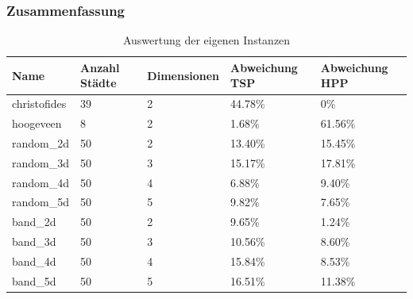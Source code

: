 \documentclass[11pt,a4paper]{article}
\begin{document}
\subsubsection{Zusammenfassung}
    \begin{table}[H]
                \centering
                \begin{tabular}{| p{2.0cm} | p{2.0cm} | p{2.5cm} | p{2.5cm} | p{2.5cm} |}
                    \hline
                    \small{\textbf{Name}} &
                    \small{\textbf{Anzahl Städte}}  & 
                    \small{\textbf{Dimensionen}} & 
                    \small{\textbf{Abweichung TSP}} & 
                    \small{\textbf{Abweichung HPP}} \\ \hline

                    christofides    & 39    & 2     & 44.78\%   & 0\%           \\ \hline
                    hoogeveen       & 8     & 2     & 1.68\%    & 61.56\%       \\ \hline
                    random\_2d      & 50    & 2     & 13.40\%   & 15.45\%       \\ \hline
                    random\_3d      & 50    & 3     & 15.17\%   & 17.81\%       \\ \hline
                    random\_4d      & 50    & 4     & 6.88\%    & 9.40\%        \\ \hline
                    random\_5d      & 50    & 5     & 9.82\%    & 7.65\%        \\ \hline
                    band\_2d        & 50    & 2     & 9.65\%    & 1.24\%        \\ \hline
                    band\_3d        & 50    & 3     & 10.56\%   & 8.60\%        \\ \hline
                    band\_4d        & 50    & 4     & 15.84\%   & 8.53\%        \\ \hline
                    band\_5d        & 50    & 5     & 16.51\%   & 11.38\%       \\ \hline
               \end{tabular}
                \caption{Auswertung der eigenen Instanzen}
                \label{tab:instanz_eigene_instanzen}
        \end{table}

\newpage



\end{document}
